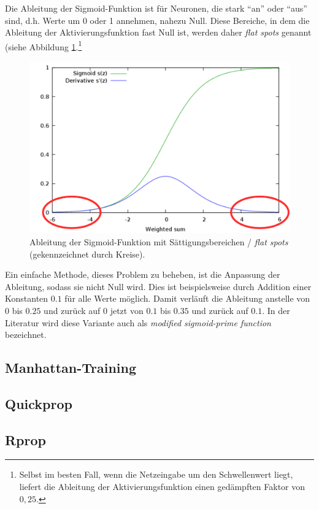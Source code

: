 Die Ableitung der Sigmoid-Funktion ist für Neuronen, die stark "`an"' oder "`aus"' sind, d.h. Werte um 0 oder 1 annehmen, nahezu Null. Diese Bereiche, in dem die Ableitung der Aktivierungsfunktion fast Null ist, werden daher \emph{flat spots} genannt (siehe Abbildung \ref{fig:ch03_saettigung-sigmoid-ableitung}.\footnote{Selbst im besten Fall, wenn die Netzeingabe um den Schwellenwert liegt, liefert die Ableitung der Aktivierungsfunktion einen gedämpften Faktor von $0,25$.}

\begin{figure}[ht!] \centering 
	\includegraphics[width=\linewidth]{figures/ch03_saettigung-sigmoid-ableitung.pdf}
	\caption{Ableitung der Sigmoid-Funktion mit Sättigungsbereichen / \emph{flat spots} (gekennzeichnet durch Kreise).}
	\label{fig:ch03_saettigung-sigmoid-ableitung}
\end{figure}

Ein einfache Methode, dieses Problem zu beheben, ist die Anpassung der Ableitung, sodass sie nicht Null wird. Dies ist beispielsweise durch Addition einer Konstanten $0.1$ für alle Werte möglich.
Damit verläuft die Ableitung anstelle von $0$ bis $0.25$ und zurück auf $0$ jetzt von $0.1$ bis $0.35$ und zurück auf $0.1$.
In der Literatur wird diese Variante auch als \emph{modified sigmoid-prime function} bezeichnet.


\subsection*{Manhattan-Training}

\subsection*{Quickprop}

\subsection*{Rprop}




